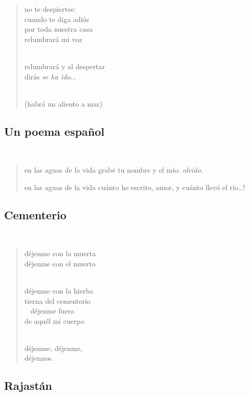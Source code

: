 \documentclass[a4paper, 12pt]{article}
\begin{document}
\begin{verse}


no te despiertes:\\
cuando te diga adiós\\
por toda nuestra casa\\
relumbrará mi voz\\
~ 

relumbrará y al despertar\\
dirás \textit{se ha ido}...\\
~ 

(habrá un aliento a mar)

\end{verse}

\pagebreak
\subsection{Un poema español}
~ 

\begin{verse}
    
en las aguas de la vida
grabé tu nombre y el mío:
\textit{olvido}.

en las aguas de la vida
cuánto he escrito, amor,
y cuánto llevó el río…!
\end{verse}

\pagebreak 

\subsection{Cementerio}
~ 

\begin{verse}
    
déjenme con la muerta\\
déjenme con el muerto\\
~ 

déjenme con la hierba\\
tierna del cementerio\\
~ 
déjenme fuera\\
de aquél mi cuerpo\\
~ 

déjenme, déjenme,\\
déjennos.\\
\end{verse}

\pagebreak
\subsection{Rajastán}
~ 
\end{document}
